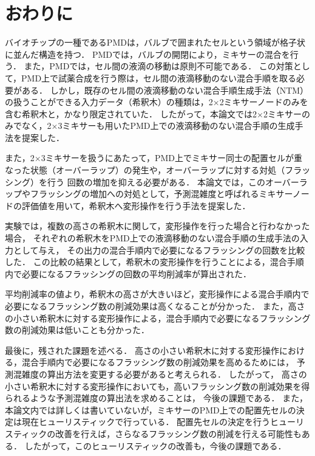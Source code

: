 \chapter{おわりに}
バイオチップの一種であるPMDは，バルブで囲まれたセルという領域が格子状に並んだ構造を持つ．
PMDでは，バルブの開閉により，ミキサーの混合を行う．
また，PMDでは，セル間の液滴の移動は原則不可能である．
この対策として，PMD上で試薬合成を行う際は，セル間の液滴移動のない混合手順を取る必要がある．
しかし，既存のセル間の液滴移動のない混合手順生成手法（NTM）の扱うことができる入力データ（希釈木）の種類は，2$\times$2ミキサーノードのみを含む希釈木と，かなり限定されていた．
したがって，本論文では2$\times$2ミキサーのみでなく，2$\times$3ミキサーも用いたPMD上での液滴移動のない混合手順の生成手法を提案した．

また，2$\times$3ミキサーを扱うにあたって，PMD上でミキサー同士の配置セルが重なった状態（オーバーラップ）の発生や，オーバーラップに対する対処（フラッシング）を行う
回数の増加を抑える必要がある．
本論文では，このオーバーラップやフラッシングの増加への対処として，予測混雑度と呼ばれるミキサーノードの評価値を用いて，希釈木へ変形操作を行う手法を提案した．

実験では，複数の高さの希釈木に関して，変形操作を行った場合と行わなかった場合，
それぞれの希釈木をPMD上での液滴移動のない混合手順の生成手法の入力として与え，
その出力の混合手順内で必要になるフラッシングの回数を比較した．
この比較の結果として，希釈木の変形操作を行うことによる，混合手順内で必要になるフラッシングの回数の平均削減率が算出された．

平均削減率の値より，希釈木の高さが大きいほど，変形操作による混合手順内で必要になるフラッシング数の削減効果は高くなることが分かった．
また，高さの小さい希釈木に対する変形操作による，混合手順内で必要になるフラッシング数の削減効果は低いことも分かった．

最後に，残された課題を述べる．
高さの小さい希釈木に対する変形操作における，混合手順内で必要になるフラッシング数の削減効果を高めるためには，
予測混雑度の算出方法を変更する必要があると考えられる．
したがって，
高さの小さい希釈木に対する変形操作においても，高いフラッシング数の削減効果を得られるような予測混雑度の算出法を求めることは，
今後の課題である．
また，本論文内では詳しくは書いていないが，ミキサーのPMD上での配置先セルの決定は現在ヒューリスティックで行っている．
配置先セルの決定を行うヒューリスティックの改善を行えば，さらなるフラッシング数の削減を行える可能性もある．
したがって，このヒューリスティックの改善も，今後の課題である．


